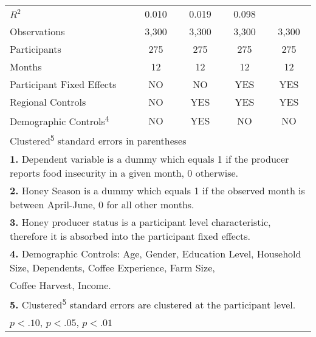 \begin{table}[htbp]
\begin{tabular}{l*{4}{c}}
\midrule
\(R^{2}\)           &       0.010         &       0.019         &       0.098         &                     \\
Observations        &       3,300         &       3,300         &       3,300         &       3,300         \\
Participants        &         275         &         275         &         275         &         275         \\
Months              &          12         &          12         &          12         &          12         \\
\hline Participant Fixed Effects&          NO         &          NO         &         YES         &         YES         \\
Regional Controls   &          NO         &         YES         &         YES         &         YES         \\
Demographic Controls\textsuperscript{4}&          NO         &         YES         &          NO         &          NO         \\
\bottomrule
\multicolumn{5}{l}{\footnotesize Clustered\textsuperscript{5} standard errors in parentheses}\\
\multicolumn{5}{l}{\footnotesize \textbf{1.} Dependent variable is a dummy which equals 1 if the producer reports food insecurity in a given month, 0 otherwise.}\\
\multicolumn{5}{l}{\footnotesize \textbf{2.} Honey Season is a dummy which equals 1 if the observed month is between April-June, 0 for all other months.}\\
\multicolumn{5}{l}{\footnotesize \textbf{3.} Honey producer status is a participant level characteristic, therefore it is absorbed into the participant fixed effects.}\\
\multicolumn{5}{l}{\footnotesize \textbf{4.} Demographic Controls: Age, Gender, Education Level, Household Size, Dependents, Coffee Experience, Farm Size,}\\
\multicolumn{5}{l}{\footnotesize Coffee Harvest, Income.}\\
\multicolumn{5}{l}{\footnotesize \textbf{5.} Clustered\textsuperscript{5} standard errors are clustered at the participant level.}\\
\multicolumn{5}{l}{\footnotesize \sym{*} \(p<.10\), \sym{**} \(p<.05\), \sym{***} \(p<.01\)}\\
\end{tabular}
\end{table}
